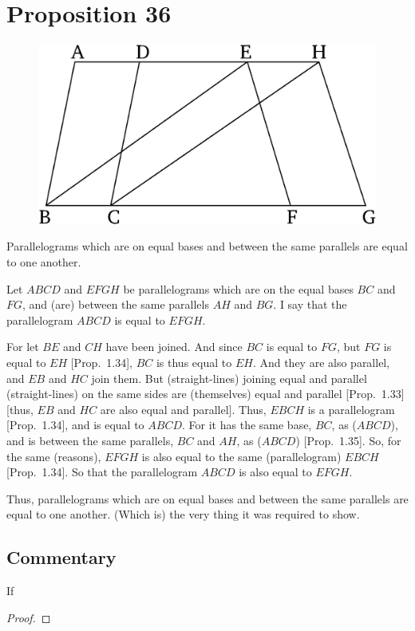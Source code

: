\chapter*{Proposition 36}



\begin{figure}[ht]
    \begin{center}
    \includegraphics[width=0.5\linewidth]{figures/fig36e.eps}
    \label{fig:prop_36}
    \end{center}
\end{figure}

Parallelograms which are on equal bases and between the same parallels are equal to one another.

Let $ABCD$ and $EFGH$ be parallelograms which are on the equal bases $BC$
and $FG$, and (are) between the same parallels $AH$ and $BG$. I say that
the parallelogram $ABCD$ is equal to $EFGH$.

For let $BE$ and $CH$ have been joined. And since $BC$ is equal to $FG$, but $FG$ is equal to $EH$ [Prop.~1.34], $BC$ is thus equal to $EH$. And they are also parallel, and $EB$ and $HC$ join them.
But (straight-lines) joining equal and parallel (straight-lines) on the
same sides are (themselves) equal and parallel [Prop.~1.33] [thus, $EB$ and $HC$
are also equal and parallel]. Thus, $EBCH$ is a parallelogram [Prop.~1.34],
and is equal to $ABCD$. For it has  the
same base, $BC$, as ($ABCD$), and is between the same parallels, $BC$ and $AH$, as ($ABCD$) [Prop.~1.35]. So,
for the same (reasons), $EFGH$ is also equal to the same (parallelogram) $EBCH$ [Prop.~1.34].  So that the
parallelogram $ABCD$ is  also equal to $EFGH$.

Thus, parallelograms which are on equal bases and between the same parallels are equal to one another. (Which is) the very thing it was required
to show.


\section*{Commentary}

\begin{proposition}\label{proposition_36}\leanok
    If
\end{proposition}
\begin{proof}
    \leanok
\end{proof}
